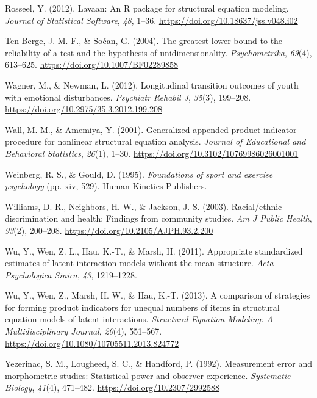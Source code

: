 \documentclass[
  man]{apa7}
\newlength{\cslhangindent}
\newlength{\cslentryspacingunit} %
\newenvironment{CSLReferences}[2] %
 {%
  \setlength{\parindent}{0pt}
  \ifodd #1
  \let\oldpar\par
  \def\par{\hangindent=\cslhangindent\oldpar}
  \fi
  \setlength{\parskip}{#2\cslentryspacingunit}
 }%
 {}
\begin{document}
\begin{CSLReferences}{1}{0}
\leavevmode{}%
Rosseel, Y. (2012). Lavaan: {An R} package for structural equation modeling. \emph{Journal of Statistical Software}, \emph{48}, 1--36. \url{https://doi.org/10.18637/jss.v048.i02}

\leavevmode{}%
Ten Berge, J. M. F., \& Sočan, G. (2004). The greatest lower bound to the reliability of a test and the hypothesis of unidimensionality. \emph{Psychometrika}, \emph{69}(4), 613--625. \url{https://doi.org/10.1007/BF02289858}

\leavevmode{}%
Wagner, M., \& Newman, L. (2012). Longitudinal transition outcomes of youth with emotional disturbances. \emph{Psychiatr Rehabil J}, \emph{35}(3), 199--208. \url{https://doi.org/10.2975/35.3.2012.199.208}

\leavevmode{}%
Wall, M. M., \& Amemiya, Y. (2001). Generalized appended product indicator procedure for nonlinear structural equation analysis. \emph{Journal of Educational and Behavioral Statistics}, \emph{26}(1), 1--30. \url{https://doi.org/10.3102/10769986026001001}

\leavevmode{}%
Weinberg, R. S., \& Gould, D. (1995). \emph{Foundations of sport and exercise psychology} (pp. xiv, 529). Human Kinetics Publishers.

\leavevmode{}%
Williams, D. R., Neighbors, H. W., \& Jackson, J. S. (2003). Racial/ethnic discrimination and health: {Findings} from community studies. \emph{Am J Public Health}, \emph{93}(2), 200--208. \url{https://doi.org/10.2105/AJPH.93.2.200}

\leavevmode{}%
Wu, Y., Wen, Z. L., Hau, K.-T., \& Marsh, H. (2011). Appropriate standardized estimates of latent interaction models without the mean structure. \emph{Acta Psychologica Sinica}, \emph{43}, 1219--1228.

\leavevmode{}%
Wu, Y., Wen, Z., Marsh, H. W., \& Hau, K.-T. (2013). A comparison of strategies for forming product indicators for unequal numbers of items in structural equation models of latent interactions. \emph{Structural Equation Modeling: A Multidisciplinary Journal}, \emph{20}(4), 551--567. \url{https://doi.org/10.1080/10705511.2013.824772}

\leavevmode{}%
Yezerinac, S. M., Lougheed, S. C., \& Handford, P. (1992). Measurement error and morphometric studies: {Statistical} power and observer experience. \emph{Systematic Biology}, \emph{41}(4), 471--482. \url{https://doi.org/10.2307/2992588}

\end{CSLReferences}
\end{document}
